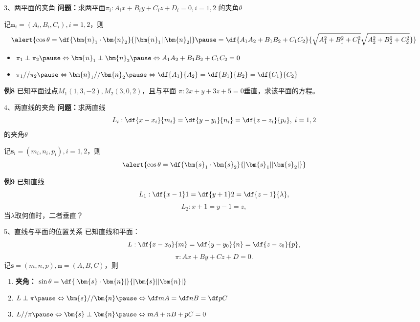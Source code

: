 \begin{frame}{3、两平面的夹角}
	\linespread{1.2}\pause
	{\bf 问题：}求两平面$\pi_i:A_ix+B_iy+C_iz+D_i=0,i=1,2$
	的夹角$\theta$\pause 
	
	记$\bm{n}_i=(A_i,B_i,C_i),i=1,2$，则
	$$\alert{\cos\theta=\df{\bm{n}_1\cdot\bm{n}_2}{|\bm{n}_1||\bm{n}_2|}\pause 
	=\df{A_1A_2+B_1B_2+C_1C_2}{\sqrt{A_1^2+B_1^2+C_1^2}\sqrt{A_2^2+B_2^2+C_2^2}}}$$
	\begin{itemize}
	  \item $\pi_1\perp\pi_2\pause \Leftrightarrow\bm{n}_1\perp\bm{n}_2\pause 
	  \Leftrightarrow A_1A_2+B_1B_2+C_1C_2=0$\pause 
	  \item $\pi_1//\pi_2\pause \Leftrightarrow\bm{n}_1//\bm{n}_2\pause 
	  \Leftrightarrow\df{A_1}{A_2}=\df{B_1}{B_2}=\df{C_1}{C_2}$
	\end{itemize}
\end{frame}

\begin{frame}
	\linespread{1.2}
	\begin{exampleblock}{{\bf 例8}\hfill}
		已知平面过点$M_1(1,3,-2),M_2(3,0,2)$，且与平面
		$\pi:2x+y+3z+5=0$垂直，求该平面的方程。
	\end{exampleblock}
\end{frame}

\begin{frame}{4、两直线的夹角}
	\linespread{1.2}\pause 
	{\bf 问题：}求两直线
	$$L_i:\df{x-x_i}{m_i}=\df{y-y_i}{n_i}=\df{z-z_i}{p_i},\;i=1,2$$
	的夹角$\theta$\pause 
	
	记$\bm{s}_i=(m_i,n_i,p_i),i=1,2$，则
	$$\alert{\cos\theta=\df{\bm{s}_1\cdot\bm{s}_2}{|\bm{s}_1||\bm{s}_2|}}$$
\end{frame}

\begin{frame}
	\linespread{1.2}
	\begin{exampleblock}{{\bf 例9}\hfill}
		已知直线
		$$L_1:\df{x-1}1=\df{y+1}2=\df{z-1}{\lambda},$$
		$$L_2:x+1=y-1=z,$$
		当$\lambda$取何值时，二者垂直？
	\end{exampleblock}
\end{frame}

\begin{frame}{5、直线与平面的位置关系}
	\linespread{1.2}\pause 
	已知直线和平面：
	$$L:\df{x-x_0}{m}=\df{y-y_0}{n}=\df{z-z_0}{p},$$
	$$\pi:Ax+By+Cz+D=0.$$\pause 
	记$\bm{s}=(m,n,p),\bm{n}=(A,B,C)$，\pause 则
	\begin{enumerate}
	  \item {\bf 夹角：}\pause
	  $\sin\theta=\df{|\bm{s}\cdot\bm{n}|}{|\bm{s}||\bm{n}|}$\pause 
	  \item $L\perp\pi\pause \Leftrightarrow\bm{s}//\bm{n}\pause 
	  \Leftrightarrow \df mA=\df nB=\df pC$\pause 
	  \item $L//\pi\pause \Leftrightarrow\bm{s}\perp\bm{n}\pause 
	  \Leftrightarrow mA+nB+pC=0$
	\end{enumerate}
\end{frame}

